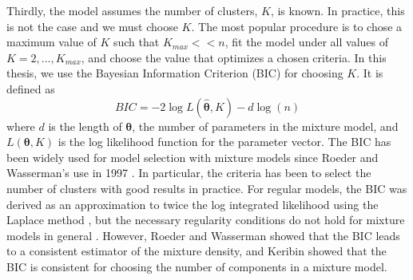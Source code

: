 \documentclass[12pt]{article}
\newcommand{\bs}[0]{\boldsymbol}
\begin{document}
Thirdly, the model assumes the number of clusters, $K$, is known. In practice, this is not the case and we must choose $K$. The most popular procedure is to chose a maximum value of $K$ such that $K_{max}<<n$, fit the model under all values of $K=2,...,K_{max}$, and choose the value that optimizes a chosen criteria. In this thesis, we use the Bayesian Information Criterion (BIC) \cite{schwarz1978} for choosing $K$. It is defined as
$$BIC = -2\log L(\hat{\bs\theta},K)- d\log(n)$$
where $d$ is the length of $\bs\theta$, the number of parameters in the mixture model, and $L(\bs\theta,K)$ is the log likelihood function for the parameter vector. The BIC has been widely used for model selection with mixture models since Roeder and Wasserman's use in 1997 \cite{roeder1997}. In particular, the criteria has been to select the number of clusters \cite{dasgupta1999,fraley1999} with good results in practice. For regular models, the BIC was derived as an approximation to twice the log integrated likelihood using the Laplace method \cite{tierney1986}, but the necessary regularity conditions do not hold for mixture models in general \cite{aitkin1985}. However, Roeder and Wasserman \cite{roeder1997} showed that the BIC leads to a consistent estimator of the mixture density, and Keribin \cite{keribin2000} showed that the BIC is consistent for choosing the number of components in a mixture model.\\
\end{document}
